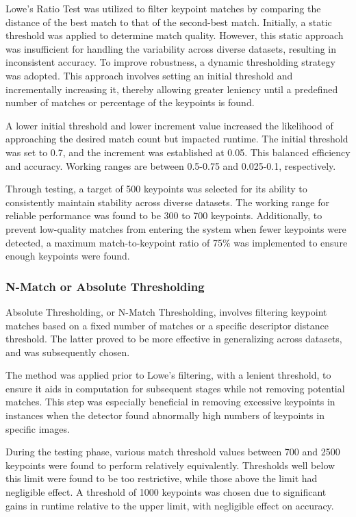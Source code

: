Lowe's Ratio Test was utilized to filter keypoint matches by comparing the distance of the best match to that of the second-best match. Initially, a static threshold was applied to determine match quality. However, this static approach was insufficient for handling the variability across diverse datasets, resulting in inconsistent accuracy. To improve robustness, a dynamic thresholding strategy was adopted. This approach involves setting an initial threshold and incrementally increasing it, thereby allowing greater leniency until a predefined number of matches or percentage of the keypoints is found.

A lower initial threshold and lower increment value increased the likelihood of approaching the desired match count but impacted runtime. The initial threshold was set to 0.7, and the increment was established at 0.05. This balanced efficiency and accuracy. Working ranges are between 0.5-0.75 and 0.025-0.1, respectively. 

Through testing, a target of 500 keypoints was selected for its ability to consistently maintain stability across diverse datasets. The working range for reliable performance was found to be 300 to 700 keypoints. Additionally, to prevent low-quality matches from entering the system when fewer keypoints were detected, a maximum match-to-keypoint ratio of 75\% was implemented to ensure enough keypoints were found. 
 


\subsubsection*{N-Match or Absolute Thresholding}

Absolute Thresholding, or N-Match Thresholding, involves filtering keypoint matches based on a fixed number of matches or a specific descriptor distance threshold. The latter proved to be more effective in generalizing across datasets, and was subsequently chosen. 

The method was applied prior to Lowe's filtering, with a lenient threshold, to ensure it aids in computation for subsequent stages while not removing potential matches. This step was especially beneficial in removing excessive keypoints in instances when the detector found abnormally high numbers of keypoints in specific images. 

During the testing phase, various match threshold values between 700 and 2500 keypoints were found to perform relatively equivalently. Thresholds well below this limit were found to be too restrictive, while those above the limit had negligible effect. A threshold of 1000 keypoints was chosen due to significant gains in runtime relative to the upper limit, with negligible effect on accuracy. 



